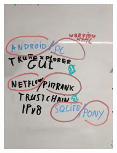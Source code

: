 \begin{figure}[h]
	\centering
	\includegraphics[width=0.5\textwidth]{images/experiment.jpg}
	\caption{\label{fig:experiment}}
\end{figure}
